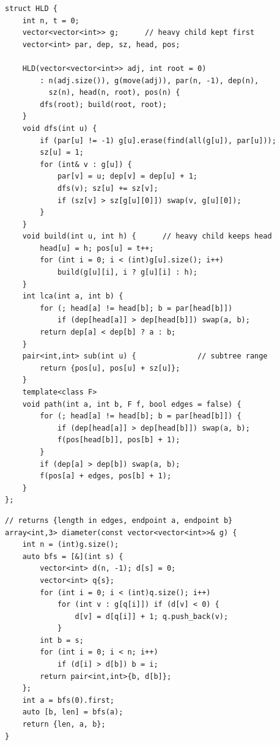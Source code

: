 \begin{lstlisting}
struct HLD {
    int n, t = 0;
    vector<vector<int>> g;      // heavy child kept first
    vector<int> par, dep, sz, head, pos;

    HLD(vector<vector<int>> adj, int root = 0)
        : n(adj.size()), g(move(adj)), par(n, -1), dep(n),
          sz(n), head(n, root), pos(n) {
        dfs(root); build(root, root);
    }
    void dfs(int u) {
        if (par[u] != -1) g[u].erase(find(all(g[u]), par[u]));
        sz[u] = 1;
        for (int& v : g[u]) {
            par[v] = u; dep[v] = dep[u] + 1;
            dfs(v); sz[u] += sz[v];
            if (sz[v] > sz[g[u][0]]) swap(v, g[u][0]);
        }
    }
    void build(int u, int h) {      // heavy child keeps head
        head[u] = h; pos[u] = t++;
        for (int i = 0; i < (int)g[u].size(); i++)
            build(g[u][i], i ? g[u][i] : h);
    }
    int lca(int a, int b) {
        for (; head[a] != head[b]; b = par[head[b]])
            if (dep[head[a]] > dep[head[b]]) swap(a, b);
        return dep[a] < dep[b] ? a : b;
    }
    pair<int,int> sub(int u) {              // subtree range
        return {pos[u], pos[u] + sz[u]};
    }
    template<class F>
    void path(int a, int b, F f, bool edges = false) {
        for (; head[a] != head[b]; b = par[head[b]]) {
            if (dep[head[a]] > dep[head[b]]) swap(a, b);
            f(pos[head[b]], pos[b] + 1);
        }
        if (dep[a] > dep[b]) swap(a, b);
        f(pos[a] + edges, pos[b] + 1);
    }
};
\end{lstlisting}


\begin{lstlisting}
// returns {length in edges, endpoint a, endpoint b}
array<int,3> diameter(const vector<vector<int>>& g) {
    int n = (int)g.size();
    auto bfs = [&](int s) {
        vector<int> d(n, -1); d[s] = 0;
        vector<int> q{s};
        for (int i = 0; i < (int)q.size(); i++)
            for (int v : g[q[i]]) if (d[v] < 0) {
                d[v] = d[q[i]] + 1; q.push_back(v);
            }
        int b = s;
        for (int i = 0; i < n; i++)
            if (d[i] > d[b]) b = i;
        return pair<int,int>{b, d[b]};
    };
    int a = bfs(0).first;
    auto [b, len] = bfs(a);
    return {len, a, b};
}
\end{lstlisting}

